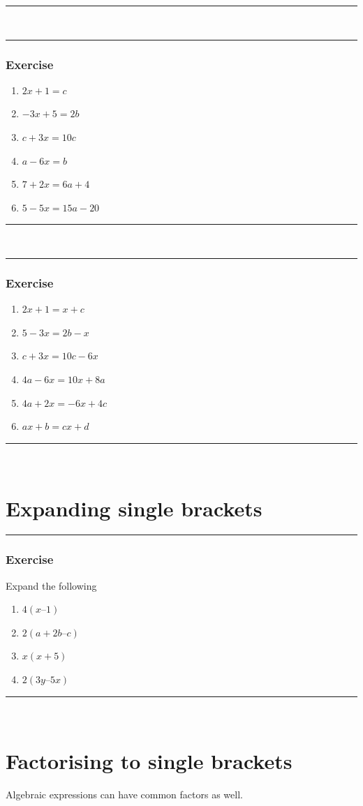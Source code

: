 \documentclass[a4paper,12pt]{article}
\newcommand\question{
	 \rule[0pt]{17cm}{0.5pt}\vspace{-0.5cm}
	\subsubsection{Exercise}

}
\newcommand\questionend{
	\rule[0pt]{17cm}{0.5pt}\vspace{0.0cm}\\
}
\begin{document}
\questionend
\newpage
\question
\begin{multicols}{2}
	\begin{enumerate}[label=\footnotesize \roman*)]
		\item $2x+1=c$
		\item $-3x+5=2b$
		\item $c+3x=10c$
		\item $a-6x=b$
		\item $7+2x=6a+4$
		\item $5-5x=15a-20$
	\end{enumerate}
\end{multicols}	
\questionend
\question
	\begin{multicols}{2}
	\begin{enumerate}[label=\footnotesize \roman*)]
		\item $2x+1=x+c$
		\item $5-3x=2b-x$
		\item $c+3x=10c-6x$
		\item $4a-6x=10x+8a$
		\item $4a+2x=-6x+4c$
		\item $ax+b=cx+d$
	\end{enumerate}
\end{multicols}	
\questionend

\newpage
\section {Expanding single brackets}
\question
Expand the following
\begin{multicols}{2}
	\begin{enumerate}[label=\normalsize \alph*)~~~]
\item $4(x – 1)$
\item $2(a + 2b – c)$ 
\item $x(x + 5) $
\item $2(3y – 5x)$ 
\end{enumerate}
\end{multicols}
\questionend\vspace{-1cm}
\section{Factorising to single brackets}
   Algebraic expressions can have common factors as well.\\
\end{document}
